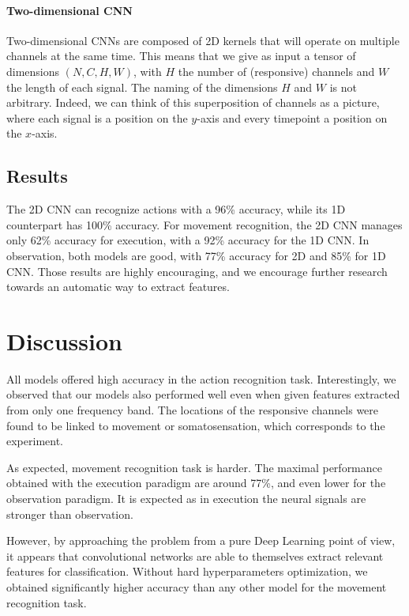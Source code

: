 \documentclass[10pt,conference,compsocconf]{IEEEtran}
\begin{document}
\paragraph{Two-dimensional CNN}
Two-dimensional CNNs are composed of 2D kernels that will operate on multiple channels at the same time. This means that we give as input a tensor of dimensions \((N, C, H, W)\), with \(H\) the number of (responsive) channels and \(W\) the length of each signal. The naming of the dimensions \(H\) and \(W\) is not arbitrary. Indeed, we can think of this superposition of channels as a picture, where each signal is a position on the \(y\)-axis and every timepoint a position on the \(x\)-axis.

\subsection{Results}
The 2D CNN can recognize actions with a 96\% accuracy, while its 1D counterpart has 100\% accuracy. For movement recognition, the 2D CNN manages only 62\% accuracy for execution, with a 92\% accuracy for the 1D CNN. In observation, both models are good, with 77\% accuracy for 2D and 85\% for 1D CNN. Those results are highly encouraging, and we encourage further research towards an automatic way to extract features.

\section{Discussion}
\label{sec:discussion}
All models offered high accuracy in the action recognition task. Interestingly, we observed that our models also performed well even when given features extracted from only one frequency band. The locations of the responsive channels were found to be linked to movement or somatosensation, which corresponds to the experiment.

As expected, movement recognition task is harder. The maximal performance obtained with the execution paradigm are around 77\%, and even lower for the observation paradigm. It is expected as in execution the neural signals are stronger than observation.

However, by approaching the problem from a pure Deep Learning point of view, it appears that convolutional networks are able to themselves extract relevant features for classification. Without hard hyperparameters optimization, we obtained significantly higher accuracy than any other model for the movement recognition task.
\end{document}

